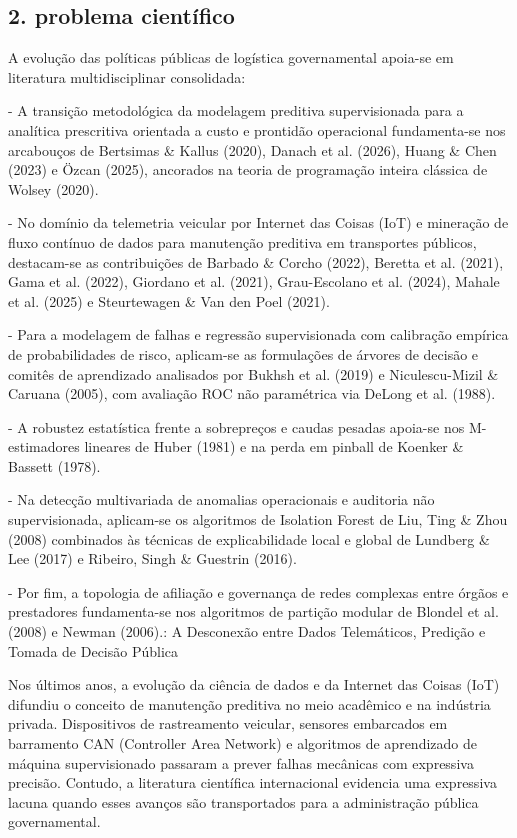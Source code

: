 \documentclass[12pt,a4paper]{article}
\begin{document}
\subsection{2. problema científico}

A evolução das políticas públicas de logística governamental apoia-se em literatura multidisciplinar consolidada:

- A transição metodológica da modelagem preditiva supervisionada para a analítica prescritiva orientada a custo e prontidão operacional fundamenta-se nos arcabouços de Bertsimas \& Kallus (2020), Danach et al. (2026), Huang \& Chen (2023) e Özcan (2025), ancorados na teoria de programação inteira clássica de Wolsey (2020).

- No domínio da telemetria veicular por Internet das Coisas (IoT) e mineração de fluxo contínuo de dados para manutenção preditiva em transportes públicos, destacam-se as contribuições de Barbado \& Corcho (2022), Beretta et al. (2021), Gama et al. (2022), Giordano et al. (2021), Grau-Escolano et al. (2024), Mahale et al. (2025) e Steurtewagen \& Van den Poel (2021).

- Para a modelagem de falhas e regressão supervisionada com calibração empírica de probabilidades de risco, aplicam-se as formulações de árvores de decisão e comitês de aprendizado analisados por Bukhsh et al. (2019) e Niculescu-Mizil \& Caruana (2005), com avaliação ROC não paramétrica via DeLong et al. (1988).

- A robustez estatística frente a sobrepreços e caudas pesadas apoia-se nos M-estimadores lineares de Huber (1981) e na perda em pinball de Koenker \& Bassett (1978).

- Na detecção multivariada de anomalias operacionais e auditoria não supervisionada, aplicam-se os algoritmos de Isolation Forest de Liu, Ting \& Zhou (2008) combinados às técnicas de explicabilidade local e global de Lundberg \& Lee (2017) e Ribeiro, Singh \& Guestrin (2016).

- Por fim, a topologia de afiliação e governança de redes complexas entre órgãos e prestadores fundamenta-se nos algoritmos de partição modular de Blondel et al. (2008) e Newman (2006).: A Desconexão entre Dados Telemáticos, Predição e Tomada de Decisão Pública

Nos últimos anos, a evolução da ciência de dados e da Internet das Coisas (IoT) difundiu o conceito de manutenção preditiva no meio acadêmico e na indústria privada. Dispositivos de rastreamento veicular, sensores embarcados em barramento CAN (Controller Area Network) e algoritmos de aprendizado de máquina supervisionado passaram a prever falhas mecânicas com expressiva precisão. Contudo, a literatura científica internacional evidencia uma expressiva lacuna quando esses avanços são transportados para a administração pública governamental.
\end{document}
